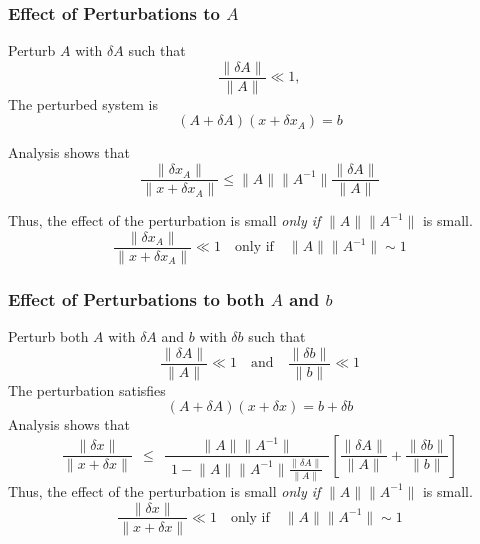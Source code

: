 \documentclass[10pt]{beamer}
\newcommand{\norm}[1]{{\ensuremath{{\|#1\|}}}}
\begin{document}
\begin{frame}
\frametitle{Effect of Perturbations to $A$}

Perturb $A$ with $\delta A$ such that
\begin{equation*}
    \frac{\norm{\delta A}}{\norm{A}} \ll 1,
\end{equation*}
The perturbed system is
\begin{equation*}
    (A + \delta A) (x + \delta x_A) = b
\end{equation*}

Analysis shows that
\begin{equation*}
    \frac{\norm{\delta x_A}}{\norm{x + \delta x_A}} \le \norm{A}\norm{A^{-1}} \frac{\norm{\delta A}}{\norm{A}}
\end{equation*}

Thus, the effect of the perturbation is small
\emph{only if} $\norm{A}\norm{A^{-1}}$ is small.
\begin{equation*}
    \frac{\norm{\delta x_A}}{\norm{x + \delta x_A}} \ll 1
    \quad \text{only if}
    \quad \norm{A}\norm{A^{-1}} \sim 1
\end{equation*}


\end{frame}
\begin{frame}
\frametitle{Effect of Perturbations to both $A$ and $b$}

Perturb both $A$ with $\delta A$ and $b$ with $\delta b$ such that
\begin{equation*}
    \frac{\norm{\delta A}}{\norm{A}} \ll 1
    \quad\text{and}\quad
    \frac{\norm{\delta b}}{\norm{b}} \ll 1
\end{equation*}
The perturbation satisfies
\begin{equation*}
    (A + \delta A) (x + \delta x) = b + \delta b
\end{equation*}
Analysis shows that
\begin{equation*}
    \frac{\norm{\delta x}}{\norm{x + \delta x}}
    \ \ \le \ \ \frac{\norm{A}\norm{A^{-1}}}{\ \ 1-\norm{A}\norm{A^{-1}} \frac{\norm{\delta A}}{\norm{A}} \ \ }
        \left[ \frac{\norm{\delta A}}{\norm{A}} + \frac{\norm{\delta b}}{\norm{b}}\right]
\end{equation*}
Thus, the effect of the perturbation is small
\emph{only if} $\norm{A}\norm{A^{-1}}$ is small.
\begin{equation*}
    \frac{\norm{\delta x}}{\norm{x + \delta x}} \ll 1
    \quad \text{only if} \quad
    \norm{A}\norm{A^{-1}} \sim 1
\end{equation*}

\end{frame}
\end{document}
